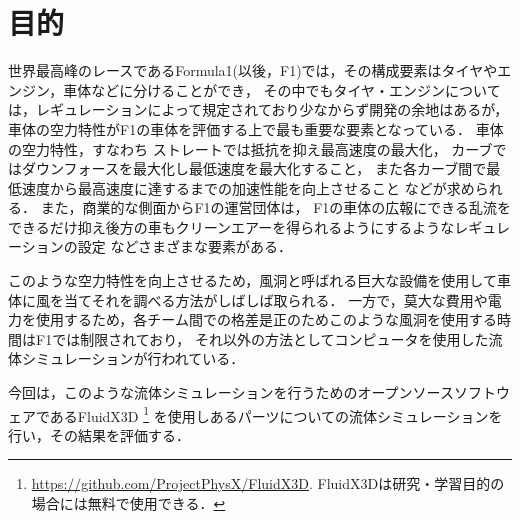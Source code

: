 \documentclass[main]{subfiles}
\begin{document}
\chapter{目的}

世界最高峰のレースであるFormula1(以後，F1)では，その構成要素はタイヤやエンジン，車体などに分けることができ，
その中でもタイヤ・エンジンについては，レギュレーションによって規定されており少なからず開発の余地はあるが，車体の空力特性がF1の車体を評価する上で最も重要な要素となっている．\cite{ref:f1-wind-tunnel}
車体の空力特性，すなわち
ストレートでは抵抗を抑え最高速度の最大化，
カーブではダウンフォースを最大化し最低速度を最大化すること，
また各カーブ間で最低速度から最高速度に達するまでの加速性能を向上させること
などが求められる．
また，商業的な側面からF1の運営団体は，
F1の車体の広報にできる乱流をできるだけ抑え後方の車もクリーンエアーを得られるようにするようなレギュレーションの設定
などさまざまな要素がある．

このような空力特性を向上させるため，風洞と呼ばれる巨大な設備を使用して車体に風を当てそれを調べる方法がしばしば取られる．
一方で，莫大な費用や電力を使用するため，各チーム間での格差是正のためこのような風洞を使用する時間はF1では制限されており，\cite{ref:f1-sporting-regulations}
それ以外の方法としてコンピュータを使用した流体シミュレーションが行われている．

今回は，このような流体シミュレーションを行うためのオープンソースソフトウェアであるFluidX3D
\footnote{
    \url{https://github.com/ProjectPhysX/FluidX3D}.
    FluidX3Dは研究・学習目的の場合には無料で使用できる．
}
を使用しあるパーツについての流体シミュレーションを行い，その結果を評価する．
\end{document}
